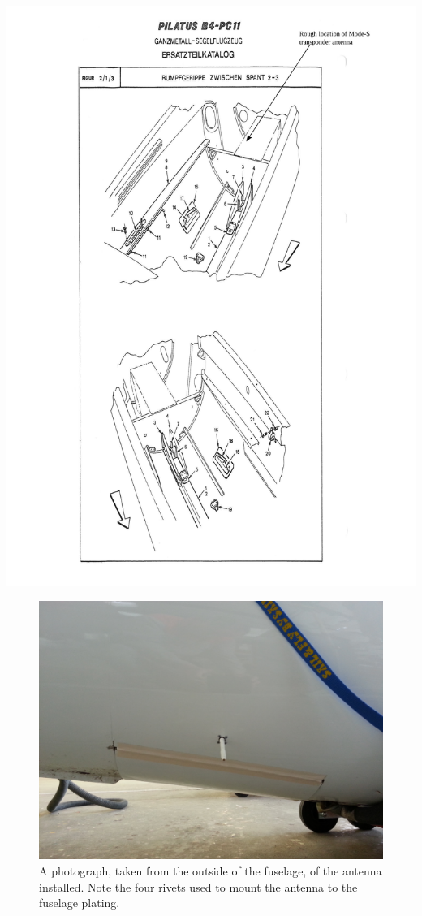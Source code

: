 \documentclass{article}
\begin{document}
\includegraphics[width=\textwidth,keepaspectratio]{b4_ersatzteil_katalog_fig_2_1_3_annotated}

\begin{figure}
\includegraphics[width=\textwidth,keepaspectratio]{outside}
\caption{A photograph, taken from the outside of the fuselage, of the antenna installed. Note the four rivets used to mount the antenna to the fuselage plating.}
\label{fig:outside}
\end{figure}
\end{document}
